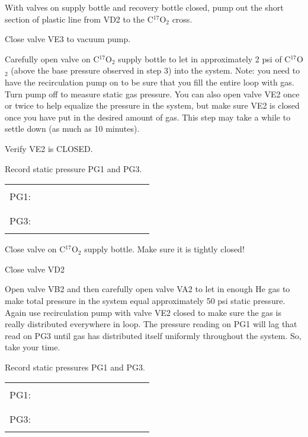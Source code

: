 \begin{enumerate}
\checkitem With valves on supply bottle and recovery bottle closed, pump
  out the short section of plastic line from VD2 to the  C$^{17}$O$_{2}$
  cross.
  
\checkitem Close valve VE3 to vacuum pump.
  
\checkitem Carefully open valve on  C$^{17}$O$_{2}$ supply bottle to
  let in approximately 2 psi of  C$^{17}$O$_{2}$ (above the base pressure
  observed in step 3) into the system.  Note: you need to have
  the recirculation pump on to be sure that you fill the entire loop with
  gas.  Turn pump off to measure static gas pressure.  You can also open
  valve VE2 once or twice to help equalize the pressure in the system,
  but make sure VE2 is closed once you have put in the desired amount of
  gas.   This step may take a while to settle down (as much as 10 minutes).

\checkitem Verify VE2 is CLOSED.
  
\checkitem Record static pressure PG1 and PG3.
     \begin{center}
     \begin{tabular}{|l|}
     \hline
      \\
     PG1:~~~~~~~~~~~~~~~~~~~~~~~~\\
      \\
     \hline
      \\
     PG3:~~~~~~~~~~~~~~~~~~~~~~~~\\
      \\
     \hline
     \end{tabular}
     \end{center}

\checkitem Close valve on  C$^{17}$O$_{2}$ supply bottle.  Make sure
  it is tightly closed!
  
\checkitem Close valve VD2
  
\checkitem Open valve VB2 and then carefully open valve VA2 to let in
  enough He gas to make total pressure in the system equal approximately
  50 psi static pressure.  Again use recirculation pump with valve VE2
  closed to make sure the gas is really distributed everywhere in loop.
  The pressure reading on PG1 will lag that read on PG3 until gas has
  distributed itself uniformly throughout the system.  So, take your time.
  
\checkitem Record static pressures PG1 and PG3.
     \begin{center}
     \begin{tabular}{|l|}
     \hline
      \\
     PG1:~~~~~~~~~~~~~~~~~~~~~~~~\\
      \\
     \hline
      \\
     PG3:~~~~~~~~~~~~~~~~~~~~~~~~\\
      \\
     \hline
     \end{tabular}
     \end{center}
  

\end{enumerate}
